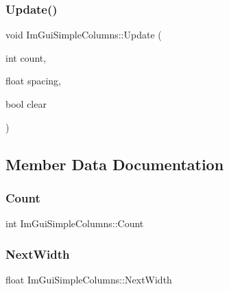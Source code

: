 \hypertarget{struct_im_gui_simple_columns_a189662e328df2bf6947d9ab292f8ed21}{}\label{struct_im_gui_simple_columns_a189662e328df2bf6947d9ab292f8ed21} 
\subsubsection{\texorpdfstring{Update()}{Update()}}
{\footnotesize\ttfamily void Im\+Gui\+Simple\+Columns\+::\+Update (\begin{DoxyParamCaption}\item[{int}]{count,  }\item[{float}]{spacing,  }\item[{bool}]{clear }\end{DoxyParamCaption})}



\subsection{Member Data Documentation}
\hypertarget{struct_im_gui_simple_columns_ac5fdbd35f74c31992c95fc4b759e9c2f}{}\label{struct_im_gui_simple_columns_ac5fdbd35f74c31992c95fc4b759e9c2f} 
\subsubsection{\texorpdfstring{Count}{Count}}
{\footnotesize\ttfamily int Im\+Gui\+Simple\+Columns\+::\+Count}

\hypertarget{struct_im_gui_simple_columns_afa5623a5d27aadeb8c08d925b189397e}{}\label{struct_im_gui_simple_columns_afa5623a5d27aadeb8c08d925b189397e} 
\subsubsection{\texorpdfstring{Next\+Width}{NextWidth}}
{\footnotesize\ttfamily float Im\+Gui\+Simple\+Columns\+::\+Next\+Width}

\hypertarget{struct_im_gui_simple_columns_a5d2739196dc2df8626e32a0e373cdffe}{}\label{struct_im_gui_simple_columns_a5d2739196dc2df8626e32a0e373cdffe} 
